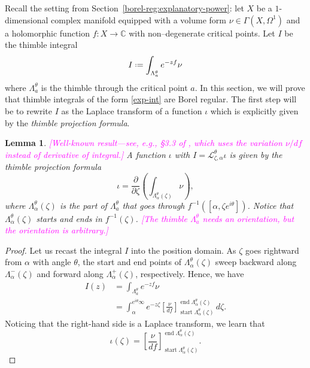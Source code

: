 \documentclass{article}
\newcommand{\C}{\mathbb{C}}
\newcommand*{\defeq}{\mathrel{\vcenter{\baselineskip0.5ex \lineskiplimit0pt
                     \hbox{\scriptsize.}\hbox{\scriptsize.}}}%
                     =}
\newcommand{\laplace}{\mathcal{L}}
\theoremstyle{definition}
\theoremstyle{plain}
\newtheorem{lemma}[definition]{Lemma}
\begin{document}
Recall the setting from Section~\ref{borel-reg:explanatory-power}: let $X$ be a $1$-dimensional complex manifold equipped with a volume form $\nu\in\Gamma(X,\Omega^1)$ and a holomorphic function $f\colon X\to\C$ with non--degenerate critical points. Let $I$ be the thimble integral 
\begin{equation}\label{exp-int}
I \defeq \int_{\Lambda_a^\theta} e^{-zf} \nu
\end{equation}
where $\Lambda_a^\theta$ is the thimble through the critical point $a$. In this section, we will prove that thimble integrals of the form \eqref{exp-int} are Borel regular. The first step will be to rewrite $I$ as the Laplace transform of a function $\iota$ which is explicitly given by the \textit{thimble projection formula}.%
\begin{lemma}\label{lem:thimble_proj_formula-proof}
\textcolor{magenta}{[Well-known result---see, e.g., \S 3.3 of \cite{pham}, which uses the variation $\nu/df$ instead of derivative of integral.]} A function $\iota$ with $I = \laplace_{\zeta, \alpha}^\theta \iota$ is given by the {\em thimble projection formula}
\begin{equation}\label{eqn:formula-proof}
    \iota = \frac{\partial}{\partial \zeta} \left( \int_{\Lambda_\alpha^\theta(\zeta)}\nu \right),
\end{equation}
where $\Lambda_\alpha^\theta(\zeta)$ is the part of $\Lambda_a^\theta$ that goes through $f^{-1}([\alpha,\zeta e^{i\theta}])$. Notice that $\Lambda_\alpha^\theta(\zeta)$ starts and ends in $f^{-1}(\zeta)$. \textcolor{magenta}{[The thimble $\Lambda_a^\theta$ needs an orientation, but the orientation is arbitrary.]}
\end{lemma}
\begin{proof}
    Let us recast the integral $I$ into the position domain. As $\zeta$ goes rightward from $\alpha$ with angle $\theta$, the start and end points of $\Lambda_\alpha^\theta(\zeta)$ sweep backward along $\Lambda^-_\alpha(\zeta)$ and forward along $\Lambda^+_\alpha(\zeta)$, respectively. Hence, we have
\begin{align*}
I(z) & = \int_{\Lambda_a^\theta} e^{-zf} \nu \\
& = \int_{\alpha}^{e^{i\theta} \infty} e^{-z\zeta} \left[\frac{\nu}{df}\right]_{\operatorname{start} \Lambda_\alpha^\theta(\zeta)}^{\operatorname{end} \Lambda_\alpha^\theta(\zeta)}\,d\zeta.
\end{align*}
Noticing that the right-hand side is a Laplace transform, we learn that
\begin{equation}\label{thimble-difference}
{\iota}(\zeta) = \left[\frac{\nu}{df}\right]_{\operatorname{start} \Lambda_\alpha^\theta(\zeta)}^{\operatorname{end} \Lambda_\alpha^\theta(\zeta)}.
\end{equation}
\end{proof}
\end{document}
